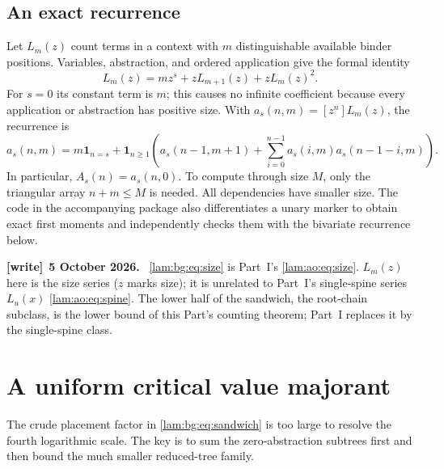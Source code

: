 \documentclass[11pt,a4paper]{article}
\numberwithin{equation}{section}
\theoremstyle{remark}
\newenvironment{writenote}[1][]{\par\smallskip\begingroup\small
 \noindent\textbf{[write]}\if\relax\detokenize{#1}\relax\else~\textbf{#1.}\fi\ }%
 {\par\endgroup\smallskip}
\begin{document}
\subsection{An exact recurrence}
Let $L_m(z)$ count terms in a context with $m$ distinguishable available binder positions. Variables, abstraction, and ordered application give the formal identity
\begin{equation}\label{lam:bg:eq:size-gf}
 L_m(z)=mz^s+zL_{m+1}(z)+zL_m(z)^2.
\end{equation}
For $s=0$ its constant term is $m$; this causes no infinite coefficient because every application or abstraction has positive size. With $a_s(n,m)=[z^n]L_m(z)$, the recurrence is
\begin{equation}\label{lam:bg:eq:size-rec}
 a_s(n,m)=m\mathbf1_{n=s}
    +\mathbf1_{n\ge1}\left(a_s(n-1,m+1)
      +\sum_{i=0}^{n-1}a_s(i,m)a_s(n-1-i,m)\right).
\end{equation}
In particular, $A_s(n)=a_s(n,0)$. To compute through size $M$, only the triangular array $n+m\le M$ is needed. All dependencies have smaller size. The code in the accompanying package also differentiates a unary marker to obtain exact first moments and independently checks them with the bivariate recurrence below.
\begin{writenote}[5 October 2026]
\eqref{lam:bg:eq:size} is Part~I's \eqref{lam:ao:eq:size}. $L_m(z)$ here is the size series ($z$ marks size); it is unrelated to Part~I's single-spine series $L_u(x)$ \eqref{lam:ao:eq:spine}. The lower half of the sandwich, the root-chain subclass, is the lower bound of this Part's counting theorem; Part~I replaces it by the single-spine class.
\end{writenote}

\section{A uniform critical value majorant}\label{lam:bg:sec:majorant}
The crude placement factor in \eqref{lam:bg:eq:sandwich} is too large to resolve the fourth logarithmic scale. The key is to sum the zero-abstraction subtrees first and then bound the much smaller reduced-tree family.
\end{document}
